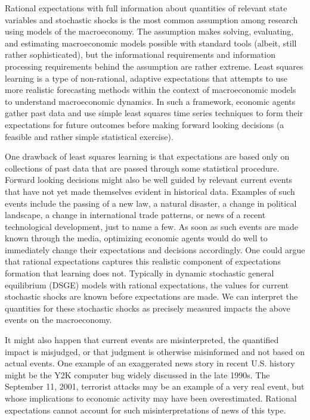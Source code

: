 \documentclass[10pt]{article}
\begin{document}
Rational expectations with full information about quantities of relevant state variables and stochastic shocks is the most common assumption among research using models of the macroeconomy.  The assumption makes solving, evaluating, and estimating macroeconomic models possible with standard tools (albeit, still rather sophisticated), but the informational requirements and information processing requirements behind the assumption are rather extreme.  Least squares learning is a type of non-rational, adaptive expectations that attempts to use more realistic forecasting methods within the context of macroeconomic models to understand macroeconomic dynamics.  In such a framework, economic agents gather past data and use simple least squares time series techniques to form their expectations for future outcomes before making forward looking decisions (a feasible and rather simple statistical exercise). 

One drawback of least squares learning is that expectations are based only on collections of past data that are passed through some statistical procedure.  Forward looking decisions might also be well guided by relevant current events that have not yet made themselves evident in historical data.  Examples of such events include the passing of a new law, a natural disaster, a change in political landscape, a change in international trade patterns, or news of a recent technological development, just to name a few.  As soon as such events are made known through the media, optimizing economic agents would do well to immediately change their expectations and decisions accordingly.  One could argue that rational expectations captures this realistic component of expectations formation that learning does not.  Typically in dynamic stochastic general equilibrium (DSGE) models with rational expectations, the values for current stochastic shocks are known before expectations are made.  We can interpret the quantities for these stochastic shocks as precisely measured impacts the above events on the macroeconomy.

It might also happen that current events are misinterpreted, the quantified impact is misjudged, or that judgment is otherwise misinformed and not based on actual events.  One example of an exaggerated news story in recent U.S. history might be the Y2K computer bug widely discussed in the late 1990s.  The September 11, 2001, terrorist attacks may be an example of a very real event, but whose implications to economic activity may have been overestimated.  Rational expectations cannot account for such misinterpretations of news of this type.  
\end{document}
